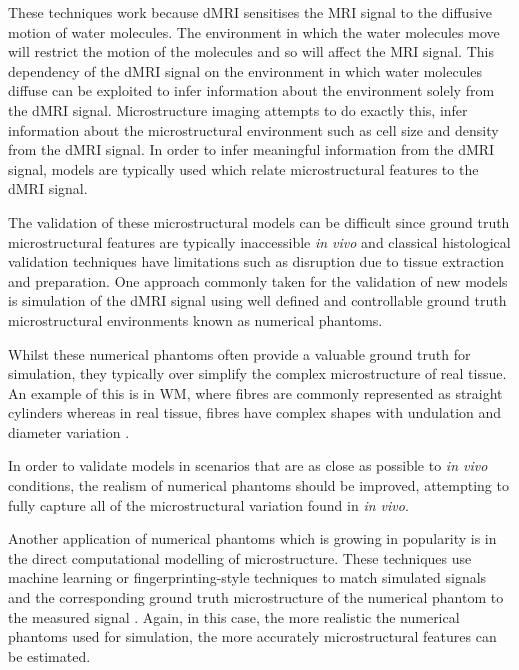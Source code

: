 \begin{comment}
\ac{MRI} provides researchers and clinicians a powerful and flexible tool for non-invasively imaging the human body \emph{in vivo} and has found extensive use over the past few decades in furthering the understanding the structure and function of the human brain.
One technique which is commonly employed to study the structure of the human brain is \ac{dMRI}.
\end{comment}

These techniques work because \ac{dMRI} sensitises the \ac{MRI} signal to the diffusive motion of water molecules.
The environment in which the water molecules move will restrict the motion of the molecules and so will affect the \ac{MRI} signal. 
This dependency of the \ac{dMRI} signal on the environment in which water molecules diffuse can be exploited to infer information about the environment solely from the \ac{dMRI} signal.  
Microstructure imaging attempts to do exactly this, infer information about the microstructural environment such as cell size and density from the \ac{dMRI} signal.
In order to infer meaningful information from the \ac{dMRI} signal, models are typically used which relate microstructural features to the \ac{dMRI} signal.

The validation of these microstructural models can be difficult since ground truth microstructural features are typically inaccessible \emph{in vivo} and classical histological validation techniques have limitations such as disruption due to tissue extraction and preparation. 
One approach commonly taken for the validation of new models is simulation of the \ac{dMRI} signal using well defined and controllable ground truth microstructural environments known as numerical phantoms. 

Whilst these numerical phantoms often provide a valuable ground truth for simulation, they typically over simplify the complex microstructure of real tissue.
An example of this is in \ac{WM}, where fibres are commonly represented as straight cylinders \cite{Hall2009,Leemans2005} whereas in real tissue, fibres have complex shapes with undulation and diameter variation \cite{Nilsson2013,Lee2018a}.

In order to validate models in scenarios that are as close as possible to \emph{in vivo} conditions, the realism of numerical phantoms should be improved, attempting to fully capture all of the microstructural variation found in \emph{in vivo}.

Another application of numerical phantoms which is growing in popularity is in the direct computational modelling of microstructure.
These techniques use machine learning or fingerprinting-style techniques to match simulated signals and the corresponding ground truth microstructure of the numerical phantom to the measured signal \cite{Rensonnet2018,Hill2018,Palombo2018a,Nedjati-Gilani2017}.
Again, in this case, the more realistic the numerical phantoms used for simulation, the more accurately microstructural features can be estimated. 

